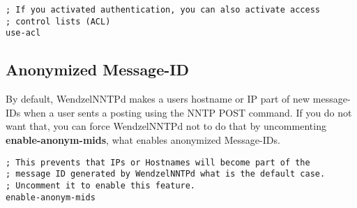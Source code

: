 \begin{verbatim}
; If you activated authentication, you can also activate access
; control lists (ACL)
use-acl
\end{verbatim}

\subsection{Anonymized Message-ID}

By default, WendzelNNTPd makes a users hostname or IP part of new message-IDs when a user sents a posting using the NNTP POST command. If you do not want that, you can force WendzelNNTPd not to do that by uncommenting {\bf enable-anonym-mids}, what enables anonymized Message-IDs.

\begin{verbatim}
; This prevents that IPs or Hostnames will become part of the
; message ID generated by WendzelNNTPd what is the default case.
; Uncomment it to enable this feature.
enable-anonym-mids
\end{verbatim}


